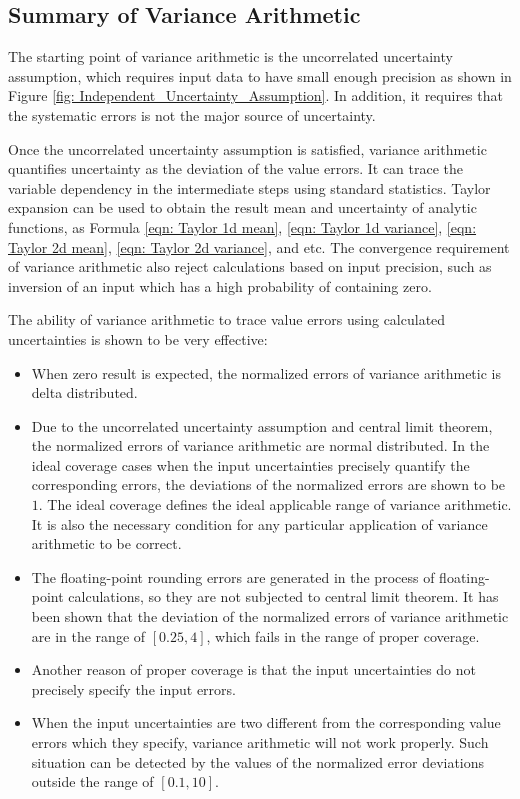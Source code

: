 \documentclass[twoside]{article}
\numberwithin{equation}{section}
\begin{document}
\subsection{Summary of Variance Arithmetic}

The starting point of variance arithmetic is the uncorrelated uncertainty assumption, which requires input data to have small enough precision as shown in Figure \ref{fig: Independent_Uncertainty_Assumption}.  In addition, it requires that the systematic errors is not the major source of uncertainty.

Once the uncorrelated uncertainty assumption is satisfied, variance arithmetic quantifies uncertainty as the deviation of the value errors.
It can trace the variable dependency in the intermediate steps using standard statistics.
Taylor expansion can be used to obtain the result mean and uncertainty of analytic functions, as Formula \eqref{eqn: Taylor 1d mean}, \eqref{eqn: Taylor 1d variance}, \eqref{eqn: Taylor 2d mean}, \eqref{eqn: Taylor 2d variance}, and etc.
The convergence requirement of variance arithmetic also reject calculations based on input precision, such as inversion of an input which has a high probability of containing zero. 

The ability of variance arithmetic to trace value errors using calculated uncertainties is shown to be very effective:
\begin{itemize}
\item When zero result is expected, the normalized errors of variance arithmetic is delta distributed.

\item Due to the uncorrelated uncertainty assumption and central limit theorem, the normalized errors of variance arithmetic are normal distributed.
In the ideal coverage cases when the input uncertainties precisely quantify the corresponding errors, the deviations of the normalized errors are shown to be $1$.
The ideal coverage defines the ideal applicable range of variance arithmetic.
It is also the necessary condition for any particular application of variance arithmetic to be correct.

\item The floating-point rounding errors are generated in the process of floating-point calculations, so they are not subjected to central limit theorem.
It has been shown that the deviation of the normalized errors of variance arithmetic are in the range of $[0.25, 4]$, which fails in the range of proper coverage.

\item Another reason of proper coverage is that the input uncertainties do not precisely specify the input errors.

\item When the input uncertainties are two different from the corresponding value errors which they specify, variance arithmetic will not work properly.
Such situation can be detected by the values of the normalized error deviations outside the range of $[0.1, 10]$.
\end{itemize}
\end{document}
